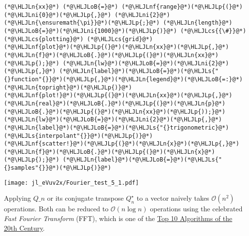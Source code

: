 \documentclass[12pt,a4paper]{article}
\newcommand{\HLJLn}[1]{#1}
\newcommand{\HLJLnf}[1]{\textcolor[RGB]{66,102,213}{#1}}
\newcommand{\HLJLs}[1]{\textcolor[RGB]{201,61,57}{#1}}
\newcommand{\HLJLni}[1]{\textcolor[RGB]{59,151,46}{#1}}
\newcommand{\HLJLoB}[1]{\textcolor[RGB]{102,102,102}{\textbf{#1}}}
\newcommand{\HLJLp}[1]{#1}
\newcommand{\HLJLcs}[1]{\textcolor[RGB]{153,153,119}{\textit{#1}}}
\begin{document}
\begin{lstlisting}
(*@\HLJLn{xx}@*) (*@\HLJLoB{=}@*) (*@\HLJLnf{range}@*)(*@\HLJLp{(}@*)(*@\HLJLni{0}@*)(*@\HLJLp{,}@*) (*@\HLJLni{2}@*)(*@\HLJLn{\ensuremath{\pi}}@*)(*@\HLJLp{;}@*) (*@\HLJLn{length}@*)(*@\HLJLoB{=}@*)(*@\HLJLni{1000}@*)(*@\HLJLp{)}@*) (*@\HLJLcs{{\#}}@*) (*@\HLJLcs{plotting}@*) (*@\HLJLcs{grid}@*)
(*@\HLJLnf{plot}@*)(*@\HLJLp{(}@*)(*@\HLJLn{xx}@*)(*@\HLJLp{,}@*) (*@\HLJLn{f}@*)(*@\HLJLoB{.}@*)(*@\HLJLp{(}@*)(*@\HLJLn{xx}@*)(*@\HLJLp{);}@*) (*@\HLJLn{lw}@*)(*@\HLJLoB{=}@*)(*@\HLJLni{2}@*)(*@\HLJLp{,}@*) (*@\HLJLn{label}@*)(*@\HLJLoB{=}@*)(*@\HLJLs{"{}function"{}}@*)(*@\HLJLp{,}@*)(*@\HLJLn{legend}@*)(*@\HLJLoB{=:}@*)(*@\HLJLn{topright}@*)(*@\HLJLp{)}@*)
(*@\HLJLnf{plot!}@*)(*@\HLJLp{(}@*)(*@\HLJLn{xx}@*)(*@\HLJLp{,}@*) (*@\HLJLn{real}@*)(*@\HLJLoB{.}@*)(*@\HLJLp{(}@*)(*@\HLJLn{p}@*)(*@\HLJLoB{.}@*)(*@\HLJLp{(}@*)(*@\HLJLn{xx}@*)(*@\HLJLp{));}@*) (*@\HLJLn{lw}@*)(*@\HLJLoB{=}@*)(*@\HLJLni{2}@*)(*@\HLJLp{,}@*) (*@\HLJLn{label}@*)(*@\HLJLoB{=}@*)(*@\HLJLs{"{}trigonometric}@*) (*@\HLJLs{interpolant"{}}@*)(*@\HLJLp{)}@*)
(*@\HLJLnf{scatter!}@*)(*@\HLJLp{(}@*)(*@\HLJLn{x}@*)(*@\HLJLp{,}@*) (*@\HLJLn{f}@*)(*@\HLJLoB{.}@*)(*@\HLJLp{(}@*)(*@\HLJLn{x}@*)(*@\HLJLp{);}@*) (*@\HLJLn{label}@*)(*@\HLJLoB{=}@*)(*@\HLJLs{"{}samples"{}}@*)(*@\HLJLp{)}@*)
\end{lstlisting}

\texttt{[image: jl\_eVuv2x/Fourier\_test\_5\_1.pdf]}

Applying $Q\ensuremath{\_n}$ or its conjugate transpose $Q_n^\ensuremath{\star}$ to a vector naively takes $\mathcal{O}(n^2)$ operations. Both can be reduced to $\mathcal{O}(n \log n)$ operations using the celebrated \emph{Fast Fourier Transform} (FFT), which is one of the \href{https://pi.math.cornell.edu/~web6140/}{Top 10 Algorithms of the 20th Century}.
\end{document}
